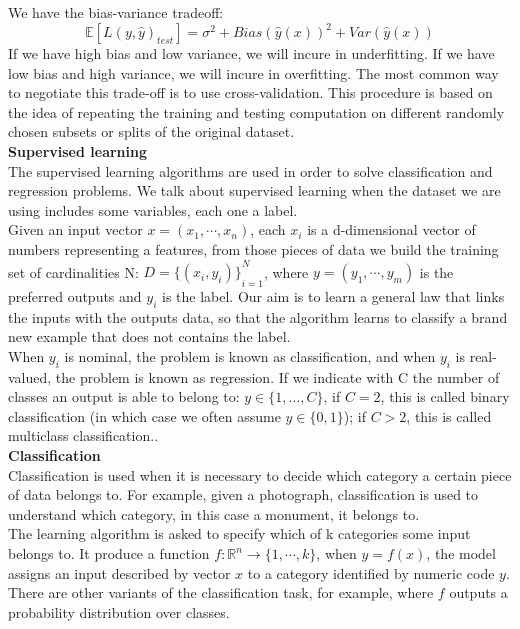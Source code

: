 \documentclass[a4paper,12pt]{report}
\begin{document}
We have the bias-variance tradeoff:
\begin{equation}
\mathbb{E} [L(y,\hat{y})_{test}]=\sigma^2+Bias(\hat{y}(x))^2 + Var(\hat{y}(x))
\end{equation}
If we have high bias and low variance, we will incure in underfitting. If we have low bias and high variance, we will incure in overfitting.\cite{errval}
The most common way to negotiate this trade-off is to use cross-validation.
This procedure is based on the idea of repeating the training and testing computation on different randomly chosen subsets or splits of the original dataset.\\

\textbf{Supervised learning}\\
The supervised learning algorithms are used in order to solve classification and regression problems. We talk about supervised learning when the dataset we are using includes some variables, each one a label.\\
Given an input vector $x=(x_{1},\cdots,x_{n})$, each $x_{i}$ is a d-dimensional vector of numbers representing a features, from those pieces of data we build the training set of cardinalities N: $D={\{ (x_{i},y_{i})\}}^{N}_{i=1}$, where $y=(y_{1},\cdots,y_{m})$ is the preferred outputs and $y_{i}$ is the label.
Our aim is to learn a general law that links the inputs with the outputs data, so that the algorithm learns to classify a brand new example that does not contains the label.\\
When $y_{i}$ is nominal, the problem is known as classification, and when $y_{i}$ is real-valued, the problem is known as regression.
If we indicate with C the number of classes an output is able to belong to: $y\in \{1,...,C\}$, if $C = 2$, this is called binary classification (in which case we often assume $y\in \{0,1\}$); if $C > 2$, this is called multiclass classification..\\

\textbf{Classification}\\
Classification is used when it is necessary to decide which category a certain piece of data belongs to. For example, given a photograph, classification is used to understand which category, in this case a monument, it belongs to.\\
The learning algorithm is asked to specify which of k categories some input
belongs to. It produce a function $f:\mathbb{R}^{n} \rightarrow \{ 1,\cdots,k\}$, when $y=f(x)$, the model assigns an input described by vector $x$ to a category identified by numeric code $y$. There are other variants of the classification task, for example, where $f$ outputs a probability distribution over classes.\\
\end{document}
